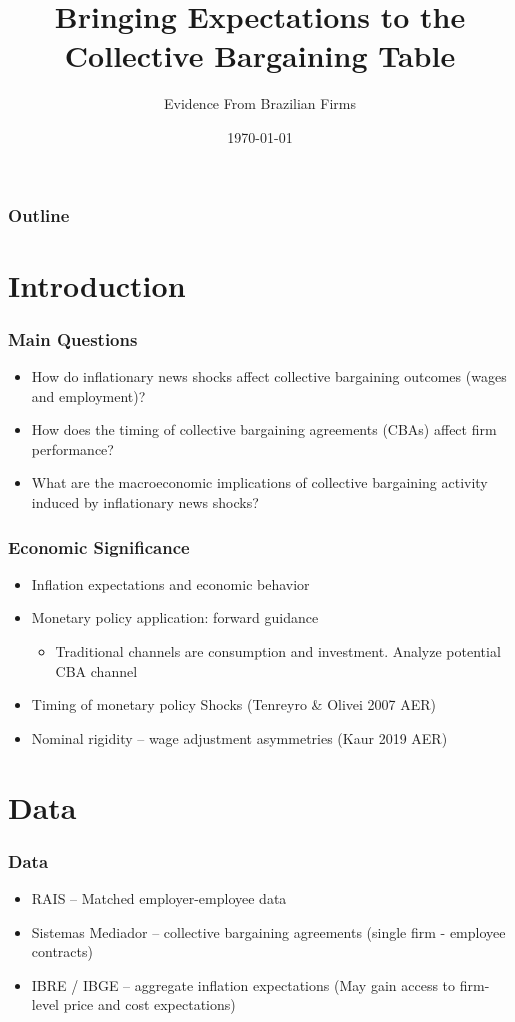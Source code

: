 \documentclass{beamer}
\title{Bringing Expectations to the Collective Bargaining Table}
\subtitle{Evidence From Brazilian Firms}
\date{\today}
\begin{document}
\begin{frame}
\titlepage
\end{frame}


\begin{frame}
\frametitle{Outline}
\tableofcontents
\end{frame}

\section{Introduction}
\begin{frame}
\frametitle{Main Questions}
	\begin{itemize}
		\item How do inflationary news shocks affect collective bargaining outcomes (wages and employment)?
		\item How does the timing of collective bargaining agreements (CBAs) affect firm performance?
		\item What are the macroeconomic implications of collective bargaining activity induced by inflationary news shocks? 
	\end{itemize}
\end{frame}

\begin{frame}
\frametitle{Economic Significance}
	\begin{itemize}
		\item Inflation expectations and economic behavior
		\item Monetary policy application: forward guidance
			\begin{itemize}
				\item Traditional channels are consumption and investment. Analyze potential CBA channel
			\end{itemize}
		\item Timing of monetary policy Shocks (Tenreyro \& Olivei 2007 AER)
		\item Nominal rigidity \--- wage adjustment asymmetries (Kaur 2019 AER)
	\end{itemize}
\end{frame}

\section{Data}
\begin{frame}
\frametitle{Data}
	\begin{itemize}
		\item RAIS \--- Matched employer-employee data 
		\item Sistemas Mediador \--- collective bargaining agreements (single firm - employee contracts)
		\item IBRE / IBGE \--- aggregate inflation expectations	(May gain access to firm-level price and cost expectations)
	\end{itemize}
\end{frame}
\end{document}
